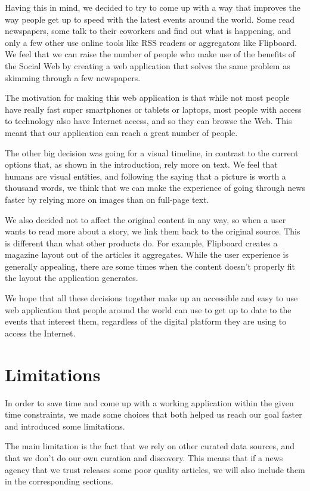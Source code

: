 \documentclass{acm_proc_10ptArticle-sp}
\begin{document}
Having this in mind, we decided to try to come up with a way that improves the way people get up to speed with the latest events around the world. Some read newspapers, some talk to their coworkers and find out what is happening, and only a few other use online tools like RSS readers or aggregators like Flipboard. We feel that we can raise the number of people who make use of the benefits of the Social Web by creating a web application that solves the same problem as skimming through a few newspapers.

The motivation for making this web application is that while not most people have really fast super smartphones or tablets or laptops, most people with access to technology also have Internet access, and so they can browse the Web. This meant that our application can reach a great number of people.

The other big decision was going for a visual timeline, in contrast to the current options that, as shown in the introduction, rely more on text. We feel that humans are visual entities, and following the saying that a picture is worth a thousand words, we think that we can make the experience of going through news faster by relying more on images than on full-page text.

We also decided not to affect the original content in any way, so when a user wants to read more about a story, we link them back to the original source. This is different than what other products do. For example, Flipboard creates a magazine layout out of the articles it aggregates. While the user experience is generally appealing, there are some times when the content doesn't properly fit the layout the application generates.

We hope that all these decisions together make up an accessible and easy to use web application that people around the world can use to get up to date to the events that interest them, regardless of the digital platform they are using to access the Internet.

\section{Limitations}

In order to save time and come up with a working application within the given time constraints, we made some choices that both helped us reach our goal faster and introduced some limitations.

The main limitation is the fact that we rely on other curated data sources, and that we don't do our own curation and discovery. This means that if a news agency that we trust releases some poor quality articles, we will also include them in the corresponding sections.
\end{document}
